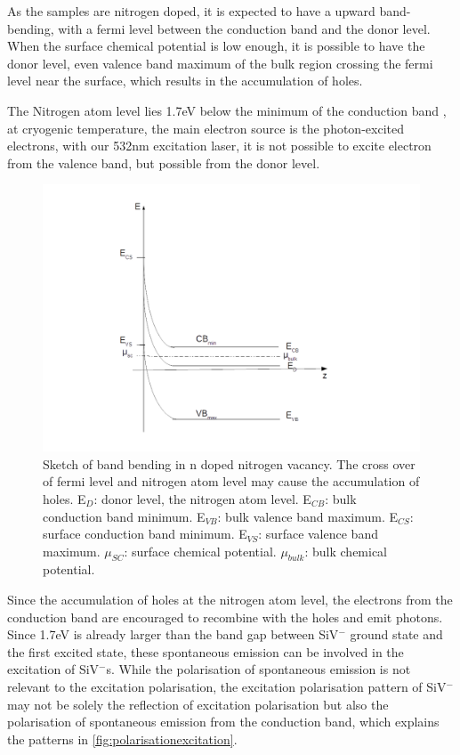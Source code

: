 As the samples are nitrogen doped, it is expected to have a upward band-bending, with a fermi level between the conduction band and the donor level. When the surface chemical potential is low enough, it is possible to have the donor level, even valence band maximum of the bulk region crossing the fermi level near the surface, which results in the accumulation of holes. 

The Nitrogen atom level lies 1.7eV below the minimum of the conduction band \citep{diederich_electron_1998}, at cryogenic temperature, the main electron source is the photon-excited electrons, with our 532nm excitation laser, it is not possible to excite electron from the valence band, but possible from the donor level.

\begin{figure}[h]
\centering
\includegraphics[width=1\linewidth]{Figures/pic/nbandbend}
\caption{Sketch of band bending in n doped nitrogen vacancy. The cross over of fermi level and nitrogen atom level may cause the accumulation of holes. E$_{D}$: donor level, the nitrogen atom level. E$_{CB}$: bulk conduction band minimum. E$_{VB}$: bulk valence band maximum. E$_{CS}$: surface conduction band minimum. E$_{VS}$: surface valence band maximum. $\mu_{SC}$: surface chemical potential. $\mu_{bulk}$: bulk chemical potential.} 
\label{fig:nbandbend}
\end{figure}
 

Since the accumulation of holes at the nitrogen atom level, the electrons from the conduction band are encouraged to recombine with the holes and emit photons. Since 1.7eV is already larger than the band gap between SiV$^{-}$ ground state and the first excited state, these spontaneous emission can be involved in the excitation of SiV$^{-}$s. 
While the polarisation of spontaneous emission is not relevant to the excitation polarisation, the excitation polarisation pattern of SiV$^{-}$ may not be solely the reflection of excitation polarisation but also the polarisation of spontaneous emission from the conduction band, which explains the patterns in \ref{fig:polarisationexcitation}.

